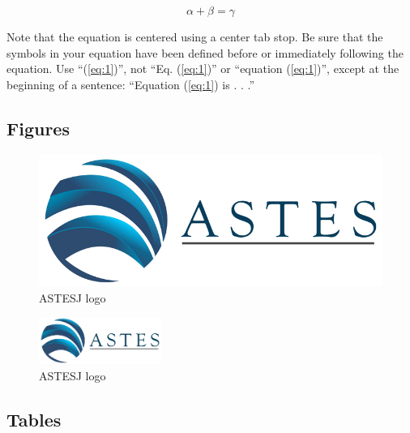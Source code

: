 \documentclass{article} %
\renewcommand{\headrulewidth}{0pt }
\begin{document}
\begin{multicols}{2}
\begin{equation}
\label{eq:1}
\alpha+\beta=\gamma
\end{equation}

Note that the equation is centered using a center tab stop. Be sure that the symbols in your equation have been defined before or immediately following the equation. Use ``(\ref{eq:1})'', not ``Eq. (\ref{eq:1})'' or ``equation (\ref{eq:1})'', except at the beginning of a sentence: ``Equation (\ref{eq:1}) is . . .''



\fancyhead{}
\renewcommand{\headrulewidth}{1pt }
\fancyfoot{}
\fancyfoot[R]{\thepage}

\subsection{Figures}

\begin{figure}[H]
	\centering
	\includegraphics[width=\linewidth]{ASTES_Logo.jpg}
	\caption{\footnotesize{ASTESJ logo}}    
		\label{astesj}
	\end{figure}

\begin{figure}[H]
	\centering
	\includegraphics[width=4cm]{ASTES_Logo.jpg}
	\caption{\footnotesize{ASTESJ logo}}    
	\label{astesj}
\end{figure}

\subsection{Tables}


\end{multicols}
\end{document}
